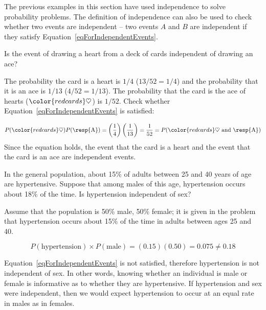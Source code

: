 The previous examples in this section have used independence to solve probability problems. The definition of independence can also be used to check whether two events are independent -- two events $A$ and $B$ are independent if they satisfy Equation~\eqref{eqForIndependentEvents}.

\begin{example}{Is the event of drawing a heart from a deck of cards independent of drawing an ace?}

The probability the card is a heart is $1/4$ ($13/52=1/4$) and the probability that it is an ace is $1/13$ ($4/52=1/13$). The probability that the card is the ace of hearts (${\color{redcards}\heartsuit}$) is $1/52$. Check whether Equation~\ref{eqForIndependentEvents} is satisfied:

\begin{align*}
P({\color{redcards}\heartsuit}) P(\text{\resp{A}}) = \left(\frac{1}{4} \right) \left( \frac{1}{13} \right) = \frac{1}{52} 
= P({\color{redcards}\heartsuit}\text{ and \resp{A}})
\end{align*}
Since the equation holds, the event that the card is a heart and the event that the card is an ace are independent events.
	
\end{example}

\begin{example}
 {In the general population, about 15\% of adults between 25 and 40  years of age are hypertensive.  Suppose that among males of this age, hypertension occurs about 18\% of the time.  Is hypertension independent of sex?} 

Assume that the population is 50\% male, 50\% female; it is given in the problem that hypertension occurs about 15\% of the time in adults between ages 25 and 40. 

\[P(\text{hypertension}) \times P(\text{male}) = (0.15)(0.50) = 0.075 \neq 0.18\] 

Equation~\ref{eqForIndependentEvents} is not satisfied, therefore hypertension is not independent of sex. In other words, knowing whether an individual is male or female is informative as to whether they are hypertensive. If hypertension and sex were independent, then we would expect hypertension to occur at an equal rate in males as in females.

\label{hypertensionIndEx}

\end{example}


